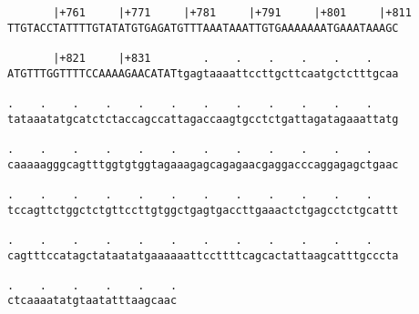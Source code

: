 \documentclass{article}
\begin{document}
\begin{Verbatim}
       |+761     |+771     |+781     |+791     |+801     |+811
TTGTACCTATTTTGTATATGTGAGATGTTTAAATAAATTGTGAAAAAAATGAAATAAAGC
                                                            
       |+821     |+831        .    .    .    .    .    .    
ATGTTTGGTTTTCCAAAAGAACATATtgagtaaaattccttgcttcaatgctctttgcaa
                                                            
.    .    .    .    .    .    .    .    .    .    .    .    
tataaatatgcatctctaccagccattagaccaagtgcctctgattagatagaaattatg
                                                            
.    .    .    .    .    .    .    .    .    .    .    .    
caaaaagggcagtttggtgtggtagaaagagcagagaacgaggacccaggagagctgaac
                                                            
.    .    .    .    .    .    .    .    .    .    .    .    
tccagttctggctctgttccttgtggctgagtgaccttgaaactctgagcctctgcattt
                                                            
.    .    .    .    .    .    .    .    .    .    .    .    
cagtttccatagctataatatgaaaaaattccttttcagcactattaagcatttgcccta
                                                            
.    .    .    .    .    .
ctcaaaatatgtaatatttaagcaac
                          
                          
\end{Verbatim}
\end{document}
